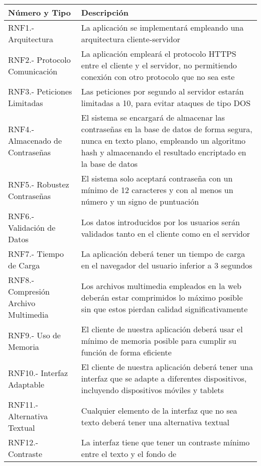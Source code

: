 \begin{appendices}
\begin{table}[H]
	\begin{center}
		\bgroup
		\def\arraystretch{1.5}
		\begin{tabular}{| p{5cm} | p{10cm} |}
			\hline
			\textbf{Número y Tipo} & \textbf{Descripción}  \\ \hline
			RNF1.- Arquitectura & La aplicación se implementará empleando una arquitectura cliente-servidor \\ \hline
			RNF2.- Protocolo Comunicación &  La aplicación empleará el protocolo HTTPS entre el cliente y
			el servidor, no permitiendo conexión con otro protocolo que no sea este\\ \hline
			RNF3.- Peticiones Limitadas & Las peticiones por segundo al servidor estarán limitadas a 10, para
			evitar ataques de tipo DOS \\ \hline
			RNF4.- Almacenado de Contraseñas &  El sistema se encargará de almacenar las contraseñas en la
			base de datos de forma segura, nunca en texto plano, empleando un algoritmo hash y almacenando
			el resultado encriptado en la base de datos\\ \hline
			RNF5.- Robustez Contraseñas &  El sistema solo aceptará contraseña con un mínimo de 12 caracteres y con al menos un número y un signo de puntuación\\ \hline
			RNF6.- Validación de Datos &  Los datos introducidos por los usuarios serán validados tanto en el
			cliente como en el servidor\\ \hline
			RNF7.- Tiempo de Carga &  La aplicación deberá tener un tiempo de carga en el navegador del
			usuario inferior a 3 segundos\\ \hline
			RNF8.- Compresión Archivo Multimedia & Los archivos multimedia empleados en la web deberán estar comprimidos lo máximo posible sin que estos pierdan calidad significativamente\\ \hline
			RNF9.- Uso de Memoria &  El cliente de nuestra aplicación deberá usar el mínimo de memoria
			posible para cumplir su función de forma eficiente\\ \hline
			RNF10.- Interfaz Adaptable &  El cliente de nuestra aplicación deberá tener una interfaz que se
			adapte a diferentes dispositivos, incluyendo dispositivos móviles y tablets\\ \hline
			RNF11.- Alternativa Textual &  Cualquier elemento de la interfaz que no sea texto deberá tener
			una alternativa textual\\ \hline
			RNF12.- Contraste &  La interfaz tiene que tener un contraste mínimo entre el texto y el fondo de

\end{tabular}
\end{center}
\end{table}
\end{appendices}
